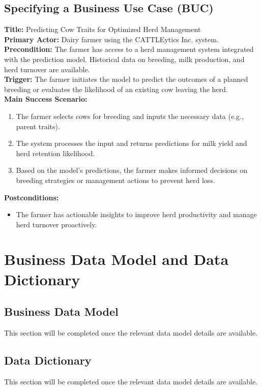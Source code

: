 \documentclass[12pt]{article}
\begin{document}
\subsection{Specifying a Business Use Case (BUC)}

\textbf{Title:} Predicting Cow Traits for Optimized Herd Management\\
\textbf{Primary Actor:} Dairy farmer using the CATTLEytics Inc. system.\\
\textbf{Precondition:} The farmer has access to a herd management system 
integrated with the prediction model. Historical data on breeding, milk 
production, and herd turnover are available.\\
\textbf{Trigger:} The farmer initiates the model to predict the outcomes of a 
planned breeding or evaluates the likelihood of an existing cow leaving the 
herd.\\
\textbf{Main Success Scenario:}
\begin{enumerate}
    \item The farmer selects cows for breeding and inputs the necessary data 
    (e.g., parent traits).
    \item The system processes the input and returns predictions for milk yield 
    and herd retention likelihood.
    \item Based on the model's predictions, the farmer makes informed decisions 
    on breeding strategies or management actions to prevent herd loss.
\end{enumerate}
\textbf{Postconditions:}
\begin{itemize}
    \item The farmer has actionable insights to improve herd productivity and 
    manage herd turnover proactively.
\end{itemize}

\section{Business Data Model and Data Dictionary}
\subsection{Business Data Model}
This section will be completed once the relevant data model details are 
available.
\subsection{Data Dictionary}
This section will be completed once the relevant data model details are 
available.
\end{document}
